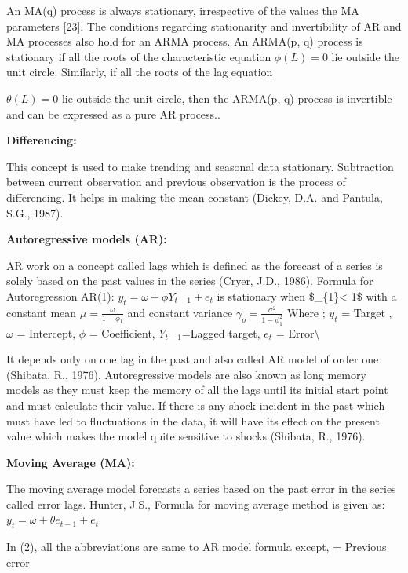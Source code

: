 \documentclass[12pt,a4paper]{book}
\begin{document}
{An MA(q) process is always stationary, irrespective of the values the MA
parameters {[}23{]}. The conditions regarding stationarity and
invertibility of AR and MA processes also hold for an ARMA process. An
ARMA(p, q) process is stationary if all the roots of the characteristic
equation \(\phi (L) = 0\) lie outside the unit circle. Similarly, if all
the roots of the lag equation

\(\theta (L) = 0\) lie outside the unit circle, then the ARMA(p, q)
process is invertible and can be expressed as a pure AR process..

\textbf{Differencing:}

This concept is used to make trending and seasonal data stationary.
Subtraction between current observation and previous observation is the
process of differencing. It helps in making the mean constant (Dickey,
D.A. and Pantula, S.G., 1987).

\textbf{Autoregressive models (AR):}

AR work on a concept called lags which is defined as the forecast of a
series is solely based on the past values in the series (Cryer, J.D.,
1986). Formula for Autoregression AR(1):
\(\displaystyle y_{t} = \omega + \phi Y _{t-1}+ e_{t}\) is stationary
when \$\textbar{}\phi\_\{1\}\textbar\textless{} 1\$ with a constant mean
\(\displaystyle \mu = \frac{\omega}{1-\phi_{1}}\) and constant variance
\(\displaystyle \gamma_{o} = \frac{\sigma^{2}}{1-\phi_{1}^{2}}\) Where ;
\(y_{t}\) = Target , \(\omega\) = Intercept, \(\phi\) = Coefficient,
\(Y_{t-1}\)=Lagged target, \(e_{t}\) = Error\textbackslash{}

It depends only on one lag in the past and also called AR model of order
one (Shibata, R., 1976). Autoregressive models are also known as long
memory models as they must keep the memory of all the lags until its
initial start point and must calculate their value. If there is any
shock incident in the past which must have led to fluctuations in the
data, it will have its effect on the present value which makes the model
quite sensitive to shocks (Shibata, R., 1976).

\textbf{Moving Average (MA):}

The moving average model forecasts a series based on the past error in
the series called error lags. Hunter, J.S., Formula for moving average
method is given as: \(y_{t} = \omega + \theta e _{t-1}+ e_{t}\)

In (2), all the abbreviations are same to AR model formula except, =
Previous error

}
\end{document}
